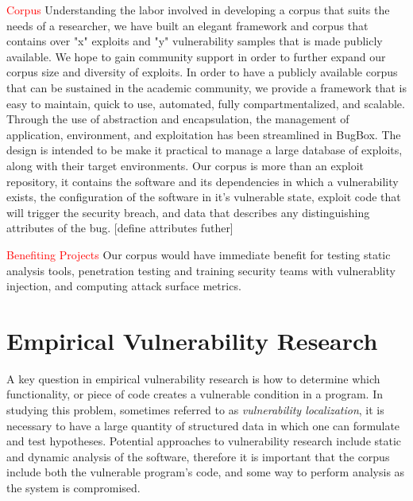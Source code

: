 \documentclass[letterpaper,twocolumn,10pt]{article}
\begin{document}
\textcolor{red}{Corpus}
Understanding the labor involved in developing a corpus that suits the needs of a researcher, we have built an elegant framework and corpus that contains over "x" exploits and "y" vulnerability samples that is made publicly available.  We hope to gain community support in order to further expand our corpus size and diversity of exploits.  In order to have a publicly available corpus that can be sustained in the academic community, we provide a framework that is easy to maintain, quick to use, automated, fully compartmentalized, and scalable.  Through the use of abstraction and encapsulation, the management of application, environment, and exploitation has been streamlined in BugBox.  The design is intended to be make it practical to manage a large database of exploits, along with their target environments. Our corpus is more than an exploit repository, it contains the software and its dependencies in which a vulnerability exists, the configuration of the software in it's vulnerable state, exploit code that will trigger the security breach, and data that describes any distinguishing attributes of the bug. [define attributes futher]\par

\textcolor{red}{Benefiting Projects}
Our corpus would have immediate benefit for testing static analysis tools, penetration testing and training security teams with vulnerablity injection, and computing attack surface metrics.

\section{Empirical Vulnerability Research}

A key question in empirical vulnerability research is how to determine which functionality, or piece of code creates a vulnerable condition in a program. In studying this problem, sometimes referred to as \emph{vulnerability localization}, it is necessary to have a large quantity of structured data in which one can formulate and test hypotheses. Potential approaches to vulnerability research include static and dynamic analysis of the software, therefore it is important that the corpus include both the vulnerable program's code, and some way to perform analysis as the system is compromised.\\
\end{document}
